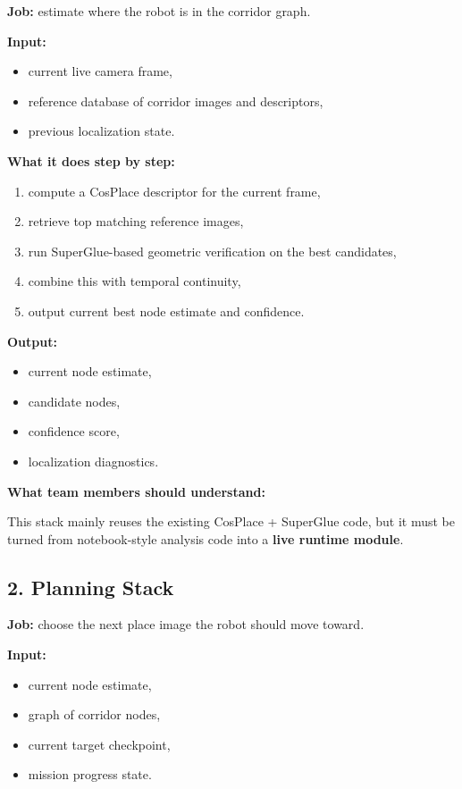 \documentclass[11pt,a4paper]{article}
\begin{document}
\textbf{Job:} estimate where the robot is in the corridor graph.

\textbf{Input:}

\begin{itemize}[nosep]
  \item current live camera frame,
  \item reference database of corridor images and descriptors,
  \item previous localization state.
\end{itemize}

\textbf{What it does step by step:}

\begin{enumerate}[nosep]
  \item compute a CosPlace descriptor for the current frame,
  \item retrieve top matching reference images,
  \item run SuperGlue-based geometric verification on the best candidates,
  \item combine this with temporal continuity,
  \item output current best node estimate and confidence.
\end{enumerate}

\textbf{Output:}

\begin{itemize}[nosep]
  \item current node estimate,
  \item candidate nodes,
  \item confidence score,
  \item localization diagnostics.
\end{itemize}

\textbf{What team members should understand:}

This stack mainly reuses the existing CosPlace + SuperGlue code, but it must be
turned from notebook-style analysis code into a \textbf{live runtime module}.


\subsection{2. Planning Stack}

\textbf{Job:} choose the next place image the robot should move toward.

\textbf{Input:}

\begin{itemize}[nosep]
  \item current node estimate,
  \item graph of corridor nodes,
  \item current target checkpoint,
  \item mission progress state.
\end{itemize}
\end{document}
